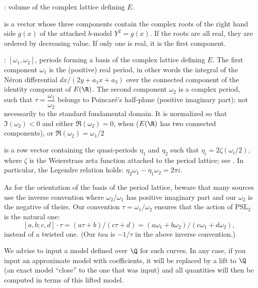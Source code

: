 \item {}: volume of the complex lattice defining $E$.

\item {} is a vector whose three components contain the complex
roots of the right hand side $g(x)$ of the attached $b$-model $Y^2 = g(x)$.
If the roots are all real, they are ordered by decreasing value. If only one
is real, it is the first component.

\item {}: $[\omega_1,\omega_2]$, periods forming a basis of the
complex lattice defining $E$. The first component $\omega_1$ is the
(positive) real period, in other words the integral of the N\'eron
differential $dx/(2y+a_1x+a_3)$
over the connected component of the identity component of $E(\R)$.
The second component $\omega_2$ is a complex period, such that
$\tau=\dfrac{\omega_1}{\omega_2}$ belongs to Poincar\'e's
half-plane (positive imaginary part); not necessarily to the standard
fundamental domain. It is normalized so that $\Im(\omega_2) < 0$
and either $\Re(\omega_2) = 0$, when  ($E(\R)$ has two connected
components), or $\Re(\omega_2) = \omega_1/2$

\item {} is a row vector containing the quasi-periods $\eta_1$ and
$\eta_2$ such that $\eta_i = 2\zeta(\omega_i/2)$, where $\zeta$ is the
Weierstrass zeta function attached to the period lattice; see
. In particular, the Legendre relation holds: $\eta_2\omega_1 -
\eta_1\omega_2 = 2\pi i$.

 As for the orientation of the basis of the period lattice,
beware that many sources use the inverse convention where $\omega_2/\omega_1$
has positive imaginary part and our $\omega_2$ is the negative of theirs. Our
convention $\tau = \omega_1/\omega_2$  ensures that the action of $\text{PSL}_2$ is the natural
one:
$$[a,b;c,d]\cdot\tau = (a\tau+b)/(c\tau+d)
  = (a \omega_1 + b\omega_2)/(c\omega_1 + d\omega_2),$$
instead of a twisted one. (Our $tau$ is $-1/\tau$ in the above inverse
convention.)


We advise to input a model defined over $\Q$ for such curves. In any case,
if you input an approximate model with  coefficients, it will be
replaced by a lift to $\Q$ (an exact model ``close'' to the one that was
input) and all quantities will then be computed in terms of this lifted
model.

